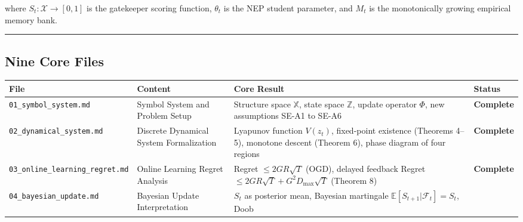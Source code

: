 \documentclass[
  12pt,
]{article}
\begin{document}
where \(S_t: \mathcal{X} \to [0,1]\) is the gatekeeper scoring function, \(\theta_t\)
is the NEP student parameter, and \(M_t\) is the monotonically growing empirical memory bank.

\begin{center}\rule{0.5\linewidth}{0.5pt}\end{center}

\subsection{Nine Core Files}\label{nine-core-files}

\begin{longtable}[]{@{}
  >{\raggedright\arraybackslash}p{}
  >{\raggedright\arraybackslash}p{}
  >{\raggedright\arraybackslash}p{}
  >{\raggedright\arraybackslash}p{}@{}}
\toprule\noalign{}
\begin{minipage}[b]{\linewidth}\raggedright
File
\end{minipage} & \begin{minipage}[b]{\linewidth}\raggedright
Content
\end{minipage} & \begin{minipage}[b]{\linewidth}\raggedright
Core Result
\end{minipage} & \begin{minipage}[b]{\linewidth}\raggedright
Status
\end{minipage} \\
\midrule\noalign{}
\endhead
\bottomrule\noalign{}
\endlastfoot
\texttt{01\_symbol\_system.md} & Symbol System and Problem Setup & Structure space
\(\mathbb{X}\), state space \(\mathbb{Z}\), update operator \(\Phi\), new assumptions SE-A1
to SE-A6 & \textbf{Complete} \\
\texttt{02\_dynamical\_system.md} & Discrete Dynamical System Formalization & Lyapunov function
\(V(z_t)\), fixed-point existence (Theorems 4--5), monotone descent (Theorem 6), phase diagram of four regions &
\textbf{Complete} \\
\texttt{03\_online\_learning\_regret.md} & Online Learning Regret Analysis & Regret
\(\leq 2GR\sqrt{T}\) (OGD), delayed feedback Regret
\(\leq 2GR\sqrt{T} + G^2 D_{\max}\sqrt{T}\) (Theorem 8) & \textbf{Complete} \\
\texttt{04\_bayesian\_update.md} & Bayesian Update Interpretation & \(S_t\)
as posterior mean, Bayesian martingale \(\mathbb{E}[S_{t+1}|\mathcal{F}_t]=S_t\), Doob

\end{longtable}
\end{document}

